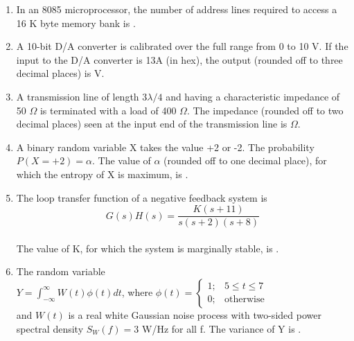 \documentclass[a4paper, 11pt]{article}
\begin{document}
\begin{enumerate}
    \hfill{}

    \item In an 8085 microprocessor, the number of address lines required to access a 16 K byte memory bank is \underline{\hspace{2cm}}.

    \hfill{}

    \item A 10-bit D/A converter is calibrated over the full range from 0 to 10 V. If the input to the D/A converter is 13A (in hex), the output (rounded off to three decimal places) is \underline{\hspace{2cm}} V.

    \hfill{}

    \item A transmission line of length $3\lambda/4$ and having a characteristic impedance of 50 $\Omega$ is terminated with a load of 400 $\Omega$. The impedance (rounded off to two decimal places) seen at the input end of the transmission line is \underline{\hspace{2cm}} $\Omega$.

    \hfill{}
    
    \item A binary random variable X takes the value +2 or -2. The probability $P(X=+2) = \alpha$. The value of $\alpha$ (rounded off to one decimal place), for which the entropy of X is maximum, is \underline{\hspace{2cm}}.

    \hfill{}

    \item The loop transfer function of a negative feedback system is\\$$G(s)H(s) = \frac{K(s+11)}{s(s+2)(s+8)}$$\\The value of K, for which the system is marginally stable, is \underline{\hspace{2cm}}.

    \hfill{}

    \item The random variable \\$Y = \int_{-\infty}^{\infty} W(t)\phi(t)dt$, where $\phi(t) = \begin{cases} 1; & 5 \le t \le 7 \\ 0; & \text{otherwise} \end{cases}$ \\and $W(t)$ is a real white Gaussian noise process with two-sided power spectral density $S_W(f) = 3$ W/Hz for all f. The variance of Y is \underline{\hspace{2cm}}.


\end{enumerate}
\end{document}
